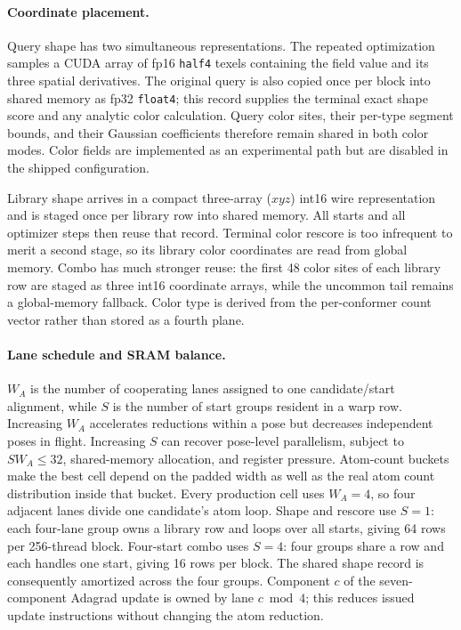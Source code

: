 

\paragraph{Coordinate placement.}
Query shape has two simultaneous representations. The repeated optimization
samples a CUDA array of fp16 \texttt{half4} texels containing the field value
and its three spatial derivatives. The original query is also copied once per
block into shared memory as fp32 \texttt{float4}; this record supplies the
terminal exact shape score and any analytic color calculation. Query color
sites, their per-type segment bounds, and their Gaussian coefficients therefore
remain shared in both color modes. Color fields are implemented as an
experimental path but are disabled in the shipped configuration.

Library shape arrives in a compact three-array ($xyz$) int16 wire representation and
is staged once per library row into shared memory. All starts and all optimizer
steps then reuse that record. Terminal color rescore is too infrequent to merit
a second stage, so its library color coordinates are read from global memory.
Combo has much stronger reuse: the first 48 color sites of each library row are
staged as three int16 coordinate arrays, while the uncommon tail remains a
global-memory fallback. Color type is derived from the per-conformer count
vector rather than stored as a fourth plane.

\paragraph{Lane schedule and SRAM balance.}
$W_A$ is the number of cooperating lanes assigned to one candidate/start
alignment, while $S$ is the number of start groups resident in a warp row.
Increasing $W_A$ accelerates reductions within a pose but decreases independent
poses in flight. Increasing $S$ can recover pose-level parallelism, subject to
$S W_A\leq32$, shared-memory allocation, and register pressure. Atom-count
buckets make the best cell depend on the padded width as well as the real atom
count distribution inside that bucket.
Every production cell uses $W_A=4$, so four adjacent lanes divide one
candidate's atom loop. Shape and rescore use $S=1$: each four-lane group owns a
library row and loops over all starts, giving 64 rows per 256-thread block.
Four-start combo uses $S=4$: four groups share a row and each handles one start,
giving 16 rows per block. The shared shape record is consequently amortized
across the four groups. Component $c$ of the seven-component Adagrad update is
owned by lane $c\bmod4$; this reduces issued update instructions without
changing the atom reduction.

